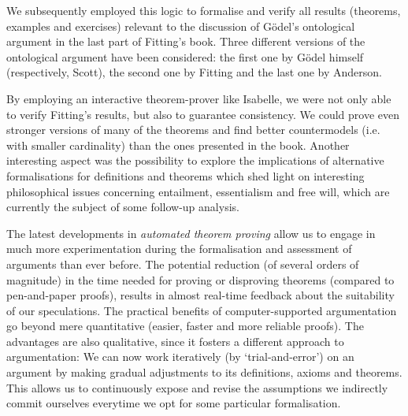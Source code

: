 \begin{isabellebody}
\begin{isamarkuptext}
We subsequently employed this logic to formalise and verify all results (theorems, examples and exercises) relevant 
to the discussion of G\"odel's ontological argument in the last part of Fitting's book. Three different versions of
the ontological argument have been considered: the first one by G\"odel himself (respectively, Scott), the second 
one by Fitting and the last one by Anderson.%
\end{isamarkuptext}\isamarkuptrue%
%
\begin{isamarkuptext}%
By employing an interactive theorem-prover like Isabelle, we were not only able to verify Fitting's results,
but also to guarantee consistency. We could prove even stronger versions
of many of the theorems and find better countermodels (i.e. with smaller cardinality) than the ones presented in the book.
Another interesting aspect was the possibility to explore the implications of alternative formalisations
for definitions and theorems which shed light on interesting philosophical issues concerning entailment,
essentialism and free will, which are currently the subject of some follow-up analysis.%
\end{isamarkuptext}\isamarkuptrue%
%
\begin{isamarkuptext}%
The latest developments in \emph{automated theorem proving} allow us to engage in much more experimentation
during the formalisation and assessment of arguments than ever before. The potential reduction (of several orders of magnitude)
in the time needed for proving or disproving theorems (compared to pen-and-paper proofs), results in almost real-time
feedback about the suitability of our speculations. The practical benefits of computer-supported argumentation go beyond
mere quantitative (easier, faster and more reliable proofs). The advantages are also qualitative, since it fosters a
different approach to argumentation: We can now work iteratively (by `trial-and-error') on an argument
by making gradual adjustments to its definitions, axioms and theorems. This allows us to continuously expose and revise 
the assumptions we indirectly commit ourselves everytime we opt for some particular formalisation.
\pagebreak%
\end{isamarkuptext}\isamarkuptrue%
%
\isadelimtheory
%
\endisadelimtheory
%
\isatagtheory
%
\endisatagtheory
{\isafoldtheory}%
%
\isadelimtheory
%
\endisadelimtheory
%
\end{isabellebody}%

